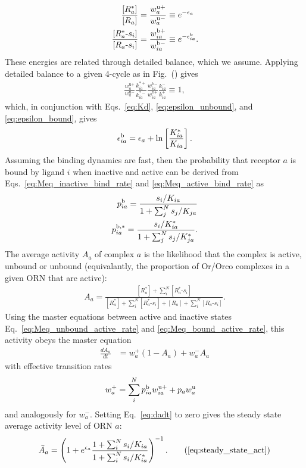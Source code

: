\begin{align}
\frac{[R^*_a]}{[R_a]} &= \frac{w^{\text{u}+}_a}{w^{\text{u}-}_a} \equiv e^{-\epsilon_a} \label{eq:epsilon_unbound} \\
\frac{[R^*_a\text{-}s_i]}{[R_a\text{-}s_i]} &= \frac{w^{\text{b}+}_{ia}}{w^{\text{b}-}_{ia}} \equiv e^{-\epsilon^{\text b}_{ia}}.\label{eq:epsilon_bound}
\end{align}
These energies are related through detailed balance, which we assume. Applying detailed balance to a given 4-cycle as in Fig.~() gives
\begin{align}
\frac{w^{\text{u}+}_a}{w^{\text{u}-}_a}\frac{k^{*+}_{ia}}{k^{*-}_{ia}}\frac{w^{\text{b}-}_{ia}}{w^{\text{b}+}_{ia}}\frac{k^{-}_{ia}}{k^{+}_{ia}} \equiv 1,
\label{eq:detailed_balance}
\end{align}
which, in conjunction with Eqs.~\ref{eq:Kd}, \ref{eq:epsilon_unbound}, and \ref{eq:epsilon_bound}, gives
\begin{align}
\epsilon_{ia}^{\text b} = \epsilon_a + \ln\left[\frac{K^*_{ia}}{K_{ia}}\right].
\label{testing_equation}
\end{align}
Assuming the binding dynamics are fast, then the probability that receptor $a$ is bound by ligand $i$ when inactive and active can be derived from  Eqs.~\ref{eq:Meq_inactive_bind_rate} and \ref{eq:Meq_active_bind_rate} as
\begin{align}
p^{\text b}_{ia} = \frac{s_i/K_{ia}}{1 + \sum_j^Ns_j/K_{ja}} \label{eq:bound_prob_ai_inactive} \\
p^{\text b, *}_{ia} = \frac{s_i/K^*_{ia}}{1 + \sum_j^Ns_j/K^*_{ja}} \label{eq:bound_prob_ai_active}.
\end{align}
The average  activity $A_a$ of complex $a$ is the likelihood that the complex is active, unbound or unbound (equivalantly, the proportion of Or/Orco complexes in a given ORN that are active):
\begin{align}
A_a = \frac{[R^*_a] + \sum_i^N[R^*_a\text{-}s_i]}{[R^*_a] + \sum_i^N[R^*_a\text{-}s_i] + {[R_a] + \sum_i^N[R_a\text{-}s_i]}}.
\end{align} 
Using the master equations between active and inactive states Eq.~\ref{eq:Meq_unbound_active_rate} and \ref{eq:Meq_bound_active_rate}, this activity obeys the master equation
\begin{align}
\frac{dA_a}{dt} &= w^+_a(1 - A_a) + w^-_aA_a
\label{eq:dadt}
\end{align}
with effective transition rates
\begin{align}
w^+_a &= \sum_i^Np^{\text b}_{ia} w^{\text u +}_{ia} + p_{a}w^{\text u}_a 
\end{align}
and analogously for $w_a^-$. Setting Eq.~\ref{eq:dadt} to zero gives the steady state average activity level of ORN $a$:
\begin{align}
\bar{A}_a = \left(1 + e^{\epsilon_a}\frac{1 + \sum_i^N s_i/K_{ia}}{1 + \sum_i^N s_i/K^*_{ia}}\right)^{-1}. \tag{\ref{eq:steady_state_act}}
\end{align}
	
